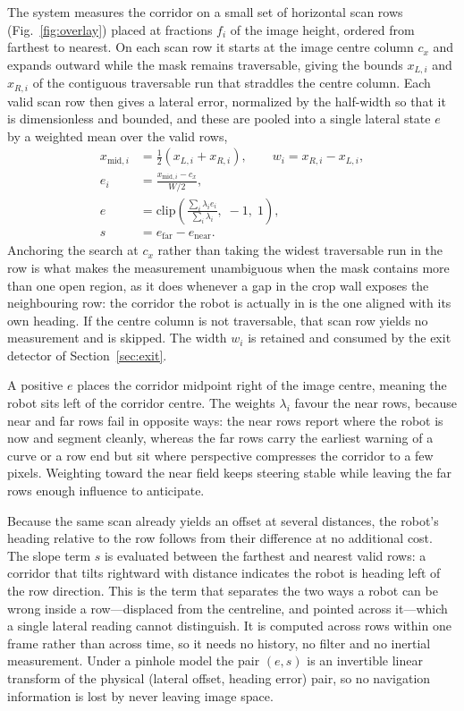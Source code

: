 \documentclass[conference]{IEEEtran}
\begin{document}
The system measures the corridor on a small set of horizontal scan rows
(Fig.~\ref{fig:overlay}) placed at fractions $f_i$ of the image height, ordered
from farthest to nearest. On each scan row it starts at the image centre column
$c_x$ and expands outward while the mask remains traversable, giving the bounds
$x_{L,i}$ and $x_{R,i}$ of the contiguous traversable run that straddles the
centre column. Each valid scan row then gives a lateral error, normalized by the
half-width so that it is dimensionless and bounded, and these are pooled into a
single lateral state $e$ by a weighted mean over the valid rows,
\begin{align}
x_{\mathrm{mid},i} &= \tfrac{1}{2}\left(x_{L,i}+x_{R,i}\right),
   \qquad w_i = x_{R,i}-x_{L,i}, \nonumber\\
e_i &= \frac{x_{\mathrm{mid},i}-c_x}{W/2}, \nonumber\\
e   &= \mathrm{clip}\!\left(
       \frac{\sum_i \lambda_i e_i}{\sum_i \lambda_i},\; -1,\; 1 \right),
       \nonumber\\
s   &= e_{\mathrm{far}} - e_{\mathrm{near}}.
\label{eq:state}
\end{align}
Anchoring the search at $c_x$ rather than taking the widest traversable run in
the row is what makes the measurement unambiguous when the mask contains more
than one open region, as it does whenever a gap in the crop wall exposes the
neighbouring row: the corridor the robot is actually in is the one aligned with
its own heading. If the centre column is not traversable, that scan row yields
no measurement and is skipped. The width $w_i$ is retained and consumed by the
exit detector of Section~\ref{sec:exit}.

A positive $e$ places the corridor midpoint right of the image centre, meaning
the robot sits left of the corridor centre. The weights $\lambda_i$ favour the
near rows, because near and far rows fail in opposite ways: the near rows report
where the robot is now and segment cleanly, whereas the far rows carry the
earliest warning of a curve or a row end but sit where perspective compresses
the corridor to a few pixels. Weighting toward the near field keeps steering
stable while leaving the far rows enough influence to anticipate.

Because the same scan already yields an offset at several distances, the robot's
heading relative to the row follows from their difference at no additional cost.
The slope term $s$ is evaluated between the farthest and nearest valid rows: a
corridor that tilts rightward with distance indicates the robot is heading left
of the row direction. This is the term that separates the two ways a robot can
be wrong inside a row---displaced from the centreline, and pointed across
it---which a single lateral reading cannot distinguish. It is computed across
rows within one frame rather than across time, so it needs no history, no filter
and no inertial measurement. Under a pinhole model the pair $(e,s)$ is an
invertible linear transform of the physical (lateral offset, heading error)
pair, so no navigation information is lost by never leaving image space.
\end{document}
